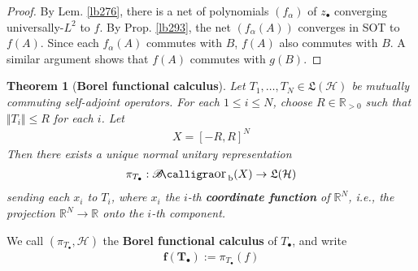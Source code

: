 \documentclass[12pt,b5paper,notitlepage]{article}
\theoremstyle{definition}
\theoremstyle{plain}
\newtheorem{thm}[df]{Theorem}
\DeclareMathOperator{\Borb}{{\mathscr{B}\text{\kern -2pt {\calligra\large or}}\,}_{\mathrm b}}
\newcommand{\fk}{\mathfrak}
\newcommand{\blt}{\bullet}
\newcommand{\Rbb}{\mathbb R}
\newcommand{\MH}{\mathcal H}
\numberwithin{equation}{section}
\begin{document}
\begin{proof}
By Lem. \ref{lb276}, there is a net of polynomials $(f_\alpha)$ of $z_\blt$ converging universally-$L^2$ to $f$. By Prop. \ref{lb293}, the net $(f_\alpha(A))$ converges in SOT to $f(A)$. Since each $f_\alpha(A)$ commutes with $B$, $f(A)$ also commutes with $B$. A similar argument shows that $f(A)$ commutes with $g(B)$.
\end{proof}




\begin{thm}[\textbf{Borel functional calculus}]\label{lb296}
Let $T_1,\dots,T_N\in\fk L(\MH)$ be mutually commuting self-adjoint operators. For each $1\leq i\leq N$, choose $R\in\Rbb_{>0}$ such that $\Vert T_i\Vert\leq R$ for each $i$. Let 
\begin{align*}
X=[-R,R]^N
\end{align*}
Then there exists a unique normal unitary representation
\begin{align*}
\pi_{T_\blt}:\Borb(X)\rightarrow\fk L(\MH)
\end{align*}
sending each $x_i$ to $T_i$, where $x_i$ the $i$-th \textbf{coordinate function} of $\Rbb^N$, i.e., the projection $\Rbb^N\rightarrow\Rbb$ onto the $i$-th component.
\end{thm}

We call $(\pi_{T_\blt},\MH)$ the \textbf{Borel functional calculus}  of $T_\blt$, and write
\begin{align*}
\pmb{f(T_\blt)}:=\pi_{T_\blt}(f)
\end{align*}
\end{document}
